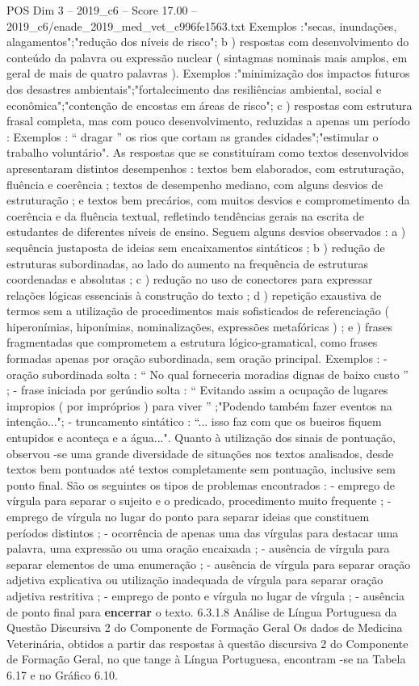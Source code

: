 \begin{textsample}{POS Dim 3 – 2019\_c6 – Score 17.00 – 2019\_c6/enade\_2019\_med\_vet\_c996fe1563.txt}
Exemplos :"secas, inundações, alagamentos";"redução dos níveis de risco"; b ) respostas com desenvolvimento do conteúdo da palavra ou expressão nuclear ( sintagmas nominais mais amplos, em geral de mais de quatro palavras ).
Exemplos :"minimização dos impactos futuros dos desastres ambientais";"fortalecimento das resiliências ambiental, social e econômica";"contenção de encostas em áreas de risco"; c ) respostas com estrutura frasal completa, mas com pouco desenvolvimento, reduzidas a apenas um período : Exemplos : “ dragar ” os rios que cortam as grandes cidades";"estimular o trabalho voluntário".
As respostas que se constituíram como textos desenvolvidos apresentaram distintos desempenhos : textos bem elaborados, com estruturação, fluência e coerência ; textos de desempenho mediano, com alguns desvios de estruturação ; e textos bem precários, com muitos desvios e comprometimento da coerência e da fluência textual, refletindo tendências gerais na escrita de estudantes de diferentes níveis de ensino.
Seguem alguns desvios observados : a ) sequência justaposta de ideias sem encaixamentos sintáticos ; b ) redução de estruturas subordinadas, ao lado do aumento na frequência de estruturas coordenadas e absolutas ; c ) redução no uso de conectores para expressar relações lógicas essenciais à construção do texto ; d ) repetição exaustiva de termos sem a utilização de procedimentos mais sofisticados de referenciação ( hiperonímias, hiponímias, nominalizações, expressões metafóricas ) ; e ) frases fragmentadas que comprometem a estrutura lógico-gramatical, como frases formadas apenas por oração subordinada, sem oração principal.
Exemplos : - oração subordinada solta : “ No qual forneceria moradias dignas de baixo custo ” ; - frase iniciada por gerúndio solta : “ Evitando assim a ocupação de lugares impropios ( por impróprios ) para viver ” ;"Podendo também fazer eventos na intenção..."; - truncamento sintático : “... isso faz com que os bueiros fiquem entupidos e aconteça e a água...".
Quanto à utilização dos sinais de pontuação, observou -se uma grande diversidade de situações nos textos analisados, desde textos bem pontuados até textos completamente sem pontuação, inclusive sem ponto final.
São os seguintes os tipos de problemas encontrados : - emprego de vírgula para separar o sujeito e o predicado, procedimento muito frequente ; - emprego de vírgula no lugar do ponto para separar ideias que constituem períodos distintos ; - ocorrência de apenas uma das vírgulas para destacar uma palavra, uma expressão ou uma oração encaixada ; - ausência de vírgula para separar elementos de uma enumeração ; - ausência de vírgula para separar oração adjetiva explicativa ou utilização inadequada de vírgula para separar oração adjetiva restritiva ; - emprego de ponto e vírgula no lugar de vírgula ; - ausência de ponto final para \textbf{encerrar} o texto. 6.3.1.8 Análise de Língua Portuguesa da Questão Discursiva 2 do Componente de Formação Geral Os dados de Medicina Veterinária, obtidos a partir das respostas à questão discursiva 2 do Componente de Formação Geral, no que tange à Língua Portuguesa, encontram -se na Tabela 6.17 e no Gráfico 6.10.

\end{textsample}

